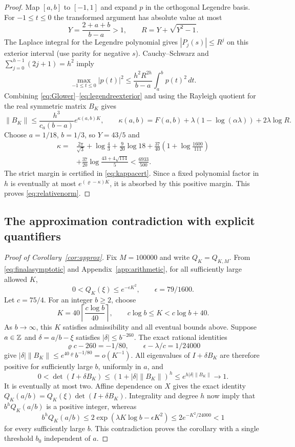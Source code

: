 \begin{proof}
Map $[a,b]$ to $[-1,1]$ and expand $p$ in the orthogonal Legendre basis.
For $-1\le t\le0$ the transformed argument has absolute value at most
\[
 Y=\frac{2+a+b}{b-a}>1,
 \qquad R=Y+\sqrt{Y^2-1}.
\]
The Laplace integral for the Legendre polynomial gives
$|P_j(s)|\le R^j$ on this exterior interval (use parity for negative
$s$). Cauchy--Schwarz and $\sum_{j=0}^{h-1}(2j+1)=h^2$ imply
\begin{equation}\label{eq:legendreexterior}
 \max_{-1\le t\le0}|p(t)|^2
 \le\frac{h^2R^{2h}}{b-a}\int_a^b p(t)^2\,dt.
\end{equation}
Combining \eqref{eq:Glower}--\eqref{eq:legendreexterior} and using the
Rayleigh quotient for the real symmetric matrix $B_K$ gives
\[
 \|B_K\|\le\frac{h^3}{c_a(b-a)}e^{\kappa(a,b)K},\qquad
 \kappa(a,b)=F(a,b)+\lambda(1-\log(\alpha\lambda))+2\lambda\log R.
\]
Choose $a=1/18$, $b=1/3$, so $Y=43/5$ and
\begin{equation}\label{eq:kappaexplicit}
\begin{split}
 \kappa={}&\frac{2\pi}{\sqrt3}+\log\frac43+\frac9{20}\log18
 +\frac{37}{40}\left(1+\log\frac{1600}{111}\right)\\
 &+\frac{37}{20}\log\frac{43+4\sqrt{114}}5
 <\frac{6933}{500}.
\end{split}
\end{equation}
The strict margin is certified in \eqref{eq:kappacert}. Since a fixed
polynomial factor in $h$ is eventually at most
$e^{(\varrho-\kappa)K}$, it is absorbed by this positive margin. This
proves \eqref{eq:relativenorm}.
\end{proof}

\subsection{The approximation contradiction with explicit quantifiers}
\begin{proof}[Proof of Corollary~\ref{cor:approx}]
Fix $M=100000$ and write $Q_K=Q_{K,M}$. From
\eqref{eq:finalasymptotic} and Appendix~\ref{app:arithmetic}, for all
sufficiently large allowed $K$,
\[
 0<Q_K(\xi)\le e^{-\epsilon K^2},\qquad\epsilon=79/1600.
\]
Let $c=75/4$. For an integer $b\ge2$, choose
\[
 K=40\left\lceil\frac{c\log b}{40}\right\rceil,
 \qquad c\log b\le K<c\log b+40.
\]
As $b\to\infty$, this $K$ satisfies admissibility and all eventual
bounds above. Suppose $a\in\mathbb Z$ and $\delta=a/b-\xi$ satisfies
$|\delta|\le b^{-260}$. The exact rational identities
\[
 \varrho c-260=-1/80,\qquad\epsilon-\lambda/c=1/24000
\]
give
$|\delta|\|B_K\|\le e^{40\varrho}b^{-1/80}=o(K^{-1})$.
All eigenvalues of $I+\delta B_K$ are therefore positive for sufficiently
large $b$, uniformly in $a$, and
\[
 0<\det(I+\delta B_K)
 \le(1+|\delta|\|B_K\|)^h
 \le e^{h|\delta|\|B_K\|}\longrightarrow1.
\]
It is eventually at most two. Affine dependence on $X$ gives the exact
identity
$Q_K(a/b)=Q_K(\xi)\det(I+\delta B_K)$. Integrality and degree $h$ now
imply that $b^hQ_K(a/b)$ is a positive integer, whereas
\[
 b^hQ_K(a/b)\le2\exp(\lambda K\log b-\epsilon K^2)
              \le2e^{-K^2/24000}<1
\]
for every sufficiently large $b$. This contradiction proves the
corollary with a single threshold $b_0$ independent of $a$.
\end{proof}

